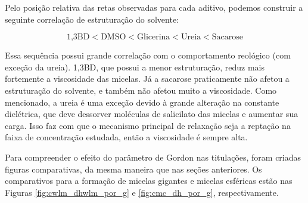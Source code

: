 		Pelo posição relativa das retas observadas para cada aditivo, podemos construir a seguinte correlação de estruturação do solvente:
		
		\begin{equation*}
			\textrm{1,3BD} < \textrm{DMSO} < \textrm{Glicerina} < \textrm{Ureia} < \textrm{Sacarose}
		\end{equation*}
		
		Essa sequência possui grande correlação com o comportamento reológico (com exceção da ureia). 1,3BD, que possui a menor estruturação, reduz mais fortemente a viscosidade das micelas. Já a sacarose praticamente não afetou a estruturação do solvente, e também não afetou muito a viscosidade. Como mencionado, a ureia é uma exceção devido à grande alteração na constante dielétrica, que deve dessorver moléculas de salicilato das micelas e aumentar sua carga. Isso faz com que o mecanismo principal de relaxação seja a reptação na faixa de concentração estudada, então a viscosidade é sempre alta.
		
		Para compreender o efeito do parâmetro de Gordon nas titulações, foram criadas figuras comparativas, da mesma maneira que nas seções anteriores. Os comparativos para a formação de micelas gigantes e micelas esféricas estão nas Figuras \ref{fig:cwlm_dhwlm_por_g} e \ref{fig:cmc_dh_por_g}, respectivamente.
		
